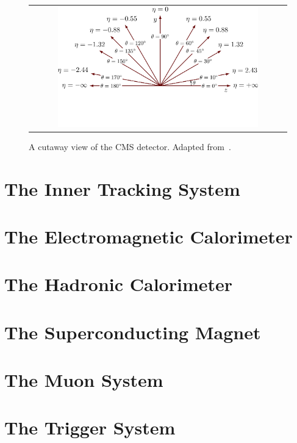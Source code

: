 \begin{figure}[tbh!]
 \begin{center}
 \begin{tabular}{c}
 \includegraphics[width=0.8\textwidth]{figures/Part2/CMS/axis2D_pseudorapidity-003}
 \end{tabular}
 \caption{A cutaway view of the \ac{CMS} detector. Adapted from~\cite{tikz:2D}.}
 \label{fig:axis2D}
 \end{center}
\end{figure}

\section{The Inner Tracking System}

\section{The Electromagnetic Calorimeter}

\section{The Hadronic Calorimeter}

\section{The Superconducting Magnet}

\section{The Muon System}

\section{The Trigger System}